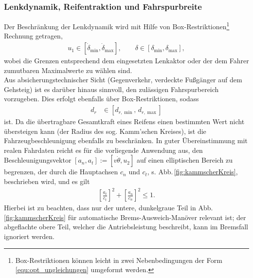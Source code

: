 \subsubsection{Lenkdynamik, Reifentraktion und Fahrspurbreite}
Der Beschränkung der Lenkdynamik wird mit Hilfe von Box-Restriktionen\footnote{Box-Restriktionen können leicht in zwei Nebenbedingungen der Form \eqref{equ:opt_ungleichungen} umgeformt werden.} Rechnung getragen,
\begin{align*}
u_1			\in [\dot \delta_{\min}, \dot \delta_{\max}], \qquad
\delta  \in [\delta_{\min}, \delta_{\max}],
\end{align*}
wobei die Grenzen entsprechend dem eingesetzten Lenkaktor oder der dem Fahrer zumutbaren Maximalwerte zu wählen sind. \\
Aus absicherungstechnischer Sicht (Gegenverkehr, verdeckte Fußgänger auf dem Gehsteig)  ist es  darüber hinaus sinnvoll, den zulässigen Fahrspurbereich vorzugeben. Dies erfolgt ebenfalls über Box-Restriktionen, sodass
\begin{align*}
d_r			&\in [d_{r,\min},\, d_{r,\max}]
\end{align*}
ist. Da die übertragbare Gesamtkraft eines Reifens einen bestimmten Wert nicht übersteigen kann (der Radius des sog. Kamm'schen Kreises), ist die Fahrzeugbeschleunigung ebenfalls zu beschränken. In guter Übereinstimmung mit realen Fahrdaten reicht es für die vorliegende Anwendung aus, den Beschleunigungsvektor $[a_n, a_t] := [v \dot\theta, u_2]$ auf einen elliptischen Bereich zu begrenzen, der durch die Hauptachsen $c_n$ und $c_t$, s. Abb.\,\ref{fig:kammscherKreis}, beschrieben wird, und es gilt \cite{breuer20012bremsenhandbuch}
\begin{align} \label{equ:ellipse}
\left[\frac{a_t}{c_t}\right]^2 + \left[\frac{a_n}{c_n}\right]^2 \leq 1.
\end{align}
Hierbei ist zu beachten, dass nur der untere, dunkelgraue Teil in Abb.\,\ref{fig:kammscherKreis} für automatische Brems-Ausweich-Manöver relevant ist; der abgeflachte obere Teil, welcher die Antriebsleistung beschreibt, kann im Bremsfall ignoriert werden.

